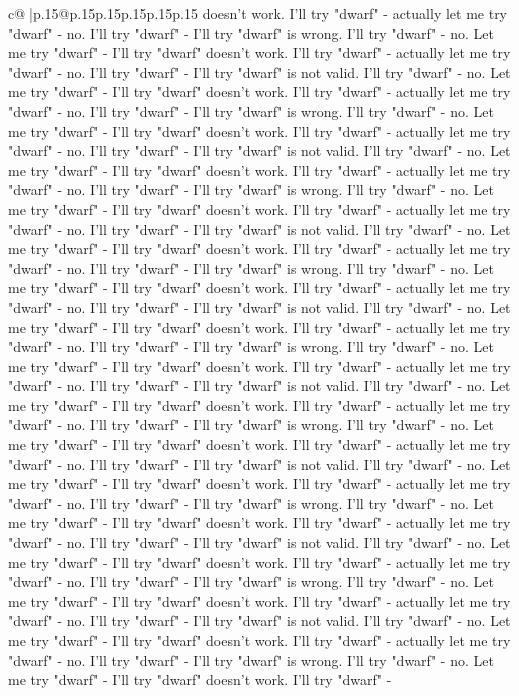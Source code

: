 \documentclass{article}
\begin{document}
{\begin{supertabular}{c@{$\;$}|p{.15\linewidth}@{}p{.15\linewidth}p{.15\linewidth}p{.15\linewidth}p{.15\linewidth}p{.15\linewidth}}
{{{doesn't work. I'll try "dwarf" {-} actually let me try "dwarf" {-} no. I'll try "dwarf" {-} I'll try "dwarf" is wrong. I'll try "dwarf" {-} no. Let me try "dwarf" {-} I'll try "dwarf" doesn't work. I'll try "dwarf" {-} actually let me try "dwarf" {-} no. I'll try "dwarf" {-} I'll try "dwarf" is not valid. I'll try "dwarf" {-} no. Let me try "dwarf" {-} I'll try "dwarf" doesn't work. I'll try "dwarf" {-} actually let me try "dwarf" {-} no. I'll try "dwarf" {-} I'll try "dwarf" is wrong. I'll try "dwarf" {-} no. Let me try "dwarf" {-} I'll try "dwarf" doesn't work. I'll try "dwarf" {-} actually let me try "dwarf" {-} no. I'll try "dwarf" {-} I'll try "dwarf" is not valid. I'll try "dwarf" {-} no. Let me try "dwarf" {-} I'll try "dwarf" doesn't work. I'll try "dwarf" {-} actually let me try "dwarf" {-} no. I'll try "dwarf" {-} I'll try "dwarf" is wrong. I'll try "dwarf" {-} no. Let me try "dwarf" {-} I'll try "dwarf" doesn't work. I'll try "dwarf" {-} actually let me try "dwarf" {-} no. I'll try "dwarf" {-} I'll try "dwarf" is not valid. I'll try "dwarf" {-} no. Let me try "dwarf" {-} I'll try "dwarf" doesn't work. I'll try "dwarf" {-} actually let me try "dwarf" {-} no. I'll try "dwarf" {-} I'll try "dwarf" is wrong. I'll try "dwarf" {-} no. Let me try "dwarf" {-} I'll try "dwarf" doesn't work. I'll try "dwarf" {-} actually let me try "dwarf" {-} no. I'll try "dwarf" {-} I'll try "dwarf" is not valid. I'll try "dwarf" {-} no. Let me try "dwarf" {-} I'll try "dwarf" doesn't work. I'll try "dwarf" {-} actually let me try "dwarf" {-} no. I'll try "dwarf" {-} I'll try "dwarf" is wrong. I'll try "dwarf" {-} no. Let me try "dwarf" {-} I'll try "dwarf" doesn't work. I'll try "dwarf" {-} actually let me try "dwarf" {-} no. I'll try "dwarf" {-} I'll try "dwarf" is not valid. I'll try "dwarf" {-} no. Let me try "dwarf" {-} I'll try "dwarf" doesn't work. I'll try "dwarf" {-} actually let me try "dwarf" {-} no. I'll try "dwarf" {-} I'll try "dwarf" is wrong. I'll try "dwarf" {-} no. Let me try "dwarf" {-} I'll try "dwarf" doesn't work. I'll try "dwarf" {-} actually let me try "dwarf" {-} no. I'll try "dwarf" {-} I'll try "dwarf" is not valid. I'll try "dwarf" {-} no. Let me try "dwarf" {-} I'll try "dwarf" doesn't work. I'll try "dwarf" {-} actually let me try "dwarf" {-} no. I'll try "dwarf" {-} I'll try "dwarf" is wrong. I'll try "dwarf" {-} no. Let me try "dwarf" {-} I'll try "dwarf" doesn't work. I'll try "dwarf" {-} actually let me try "dwarf" {-} no. I'll try "dwarf" {-} I'll try "dwarf" is not valid. I'll try "dwarf" {-} no. Let me try "dwarf" {-} I'll try "dwarf" doesn't work. I'll try "dwarf" {-} actually let me try "dwarf" {-} no. I'll try "dwarf" {-} I'll try "dwarf" is wrong. I'll try "dwarf" {-} no. Let me try "dwarf" {-} I'll try "dwarf" doesn't work. I'll try "dwarf" {-} actually let me try "dwarf" {-} no. I'll try "dwarf" {-} I'll try "dwarf" is not valid. I'll try "dwarf" {-} no. Let me try "dwarf" {-} I'll try "dwarf" doesn't work. I'll try "dwarf" {-} actually let me try "dwarf" {-} no. I'll try "dwarf" {-} I'll try "dwarf" is wrong. I'll try "dwarf" {-} no. Let me try "dwarf" {-} I'll try "dwarf" doesn't work. I'll try "dwarf" {-} }}}
\end{supertabular}}
\end{document}
